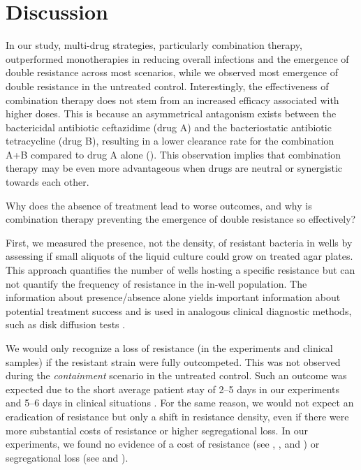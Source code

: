 \section*{Discussion}
In our study, multi-drug strategies, particularly combination therapy, outperformed monotherapies in reducing overall infections and the emergence of double resistance across most scenarios, while we observed most emergence of double resistance in the untreated control.
Interestingly, the effectiveness of combination therapy does not stem from an increased efficacy associated with higher doses. 
This is because an asymmetrical antagonism exists between the bactericidal antibiotic ceftazidime (drug A) and the bacteriostatic antibiotic tetracycline (drug B), resulting in a lower clearance rate for the combination A+B compared to drug A alone (). 
This observation implies that combination therapy may be even more advantageous when drugs are neutral or synergistic towards each other.

Why does the absence of treatment lead to worse outcomes, and why is combination therapy preventing the emergence of double resistance so effectively?

First, we measured the presence, not the density, of resistant bacteria in wells by assessing if small aliquots of the liquid culture could grow on treated agar plates. 
This approach quantifies the number of wells hosting a specific resistance but can not quantify the frequency of resistance in the in-well population. 
The information about presence/absence alone yields important information about potential treatment success and is used in analogous clinical diagnostic methods, such as disk diffusion tests \cite{eucast_disk2024}.

We would only recognize a loss of resistance (in the experiments and clinical samples) if the resistant strain were fully outcompeted. 
This was not observed during the \textit{containment} scenario in the untreated control.
Such an outcome was expected due to the short average patient stay of 2--5 days in our experiments and 5--6 days in clinical situations \cite{BAG2015}.
For the same reason, we would not expect an eradication of resistance but only a shift in resistance density, even if there were more substantial costs of resistance or higher segregational loss.
In our experiments, we found no evidence of a cost of resistance (see , , and ) or segregational loss (see  and ).

